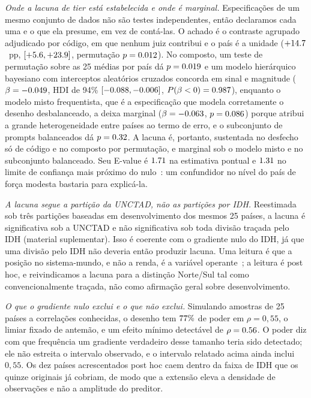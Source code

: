 \emph{Onde a lacuna de tier está estabelecida e onde é marginal.}
Especificações de um mesmo conjunto de dados não são testes independentes, então
declaramos cada uma e o que ela presume, em vez de contá-las. O achado é o
contraste agrupado adjudicado por código, em que nenhum juiz contribui e o país
é a unidade ($+14.7$~pp, $[+5.6,+23.9]$, permutação $p=0.012$). No
composto, um teste de permutação sobre as 25 médias por país dá
$p=0.019$ e um modelo hierárquico bayesiano com interceptos aleatórios
cruzados concorda em sinal e magnitude ($\beta=-0.049$, HDI de 94\%
$[-0.088,-0.006]$, $P(\beta<0)=0.987$), enquanto o modelo misto
frequentista, que é a especificação que modela corretamente o desenho
desbalanceado, a deixa marginal ($\beta=-0.063$, $p=0.086$) porque
atribui a grande heterogeneidade entre países ao termo de erro, e o subconjunto
de prompts balanceados dá $p=0.32$. A lacuna é, portanto, sustentada no
desfecho só de código e no composto por permutação, e marginal sob o modelo
misto e no subconjunto balanceado. Seu E-value é $1.71$ na estimativa
pontual e $1.31$ no limite de confiança mais próximo do
nulo~\citep{vanderweele2017evalue}: um confundidor no nível do país de força
modesta bastaria para explicá-la.

\emph{A lacuna segue a partição da UNCTAD, não as partições por IDH.}
Reestimada sob três partições baseadas em desenvolvimento dos mesmos 25 países,
a lacuna é significativa sob a UNCTAD e não significativa sob toda divisão
traçada pelo IDH (material suplementar). Isso é coerente com o gradiente nulo
do IDH, já que uma divisão pelo IDH não deveria então produzir lacuna. Uma
leitura é que a posição no sistema-mundo, e não a renda, é a variável
operante~\citep{quijano2000coloniality,mohamed2020decolonial}; a leitura é post
hoc, e reivindicamos a lacuna para a distinção Norte/Sul tal como
convencionalmente traçada, não como afirmação geral sobre desenvolvimento.

\emph{O que o gradiente nulo exclui e o que não exclui.} Simulando amostras de
25 países a correlações conhecidas, o desenho tem $77\%$ de poder em
$\rho=0,55$, o limiar fixado de antemão, e um efeito mínimo detectável de
$\rho=0.56$. O poder diz com que frequência um gradiente verdadeiro desse
tamanho teria sido detectado; ele não estreita o intervalo observado, e o
intervalo relatado acima ainda inclui $0,55$. Os dez países acrescentados post
hoc caem dentro da faixa de IDH que os quinze originais já cobriam, de modo que
a extensão eleva a densidade de observações e não a amplitude do preditor.

